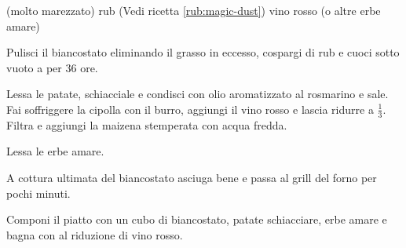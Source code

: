 \begin{ingreds}
	 (molto marezzato)	
	rub (Vedi ricetta \ref{rub:magic-dust})
	vino rosso
	 (o altre erbe amare)

\end{ingreds}

\begin{method}
Pulisci il biancostato eliminando il grasso in eccesso, cospargi di rub e cuoci sotto vuoto a  per 36 ore.

Lessa le patate, schiacciale e condisci con olio aromatizzato al rosmarino e sale. Fai soffriggere la cipolla con il burro, aggiungi il vino rosso e lascia ridurre a $\frac{1}{3}$. Filtra e aggiungi la maizena stemperata con acqua fredda.

Lessa le erbe amare.

A cottura ultimata del biancostato asciuga bene e passa al grill del forno per pochi minuti.

Componi il piatto con un cubo di biancostato, patate schiacciare, erbe amare  e bagna con al riduzione di vino rosso.


\end{method}



